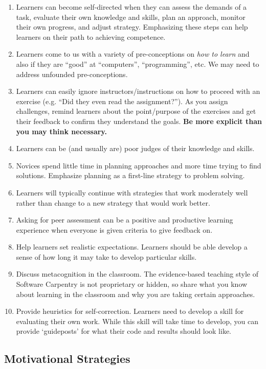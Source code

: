 \begin{enumerate}
\item
  Learners can become self-directed when they can assess the demands of
  a task, evaluate their own knowledge and skills, plan an approach,
  monitor their own progress, and adjust strategy. Emphasizing these
  steps can help learners on their path to achieving competence.
\item
  Learners come to us with a variety of pre-conceptions on \emph{how to
  learn} and also if they are ``good'' at ``computers'',
  ``programming'', etc. We may need to address unfounded
  pre-conceptions.
\item
  Learners can easily ignore instructors/instructions on how to proceed
  with an exercise (e.g. ``Did they even read the assignment?''). As you
  assign challenges, remind learners about the point/purpose of the
  exercises and get their feedback to confirm they understand the goals.
  \textbf{Be more explicit than you may think necessary.}
\item
  Learners can be (and usually are) poor judges of their knowledge and
  skills.
\item
  Novices spend little time in planning approaches and more time trying
  to find solutions. Emphasize planning as a first-line strategy to
  problem solving.
\item
  Learners will typically continue with strategies that work moderately
  well rather than change to a new strategy that would work better.
\item
  Asking for peer assessment can be a positive and productive learning
  experience when everyone is given criteria to give feedback on.
\item
  Help learners set realistic expectations. Learners should be able
  develop a sense of how long it may take to develop particular skills.
\item
  Discuss metacognition in the classroom. The evidence-based teaching
  style of Software Carpentry is not proprietary or hidden, so share
  what you know about learning in the classroom and why you are taking
  certain approaches.
\item
  Provide heuristics for self-correction. Learners need to develop a
  skill for evaluating their own work. While this skill will take time
  to develop, you can provide `guideposts' for what their code and
  results should look like.
\end{enumerate}

\subsection{Motivational Strategies}\label{motivational-strategies}

